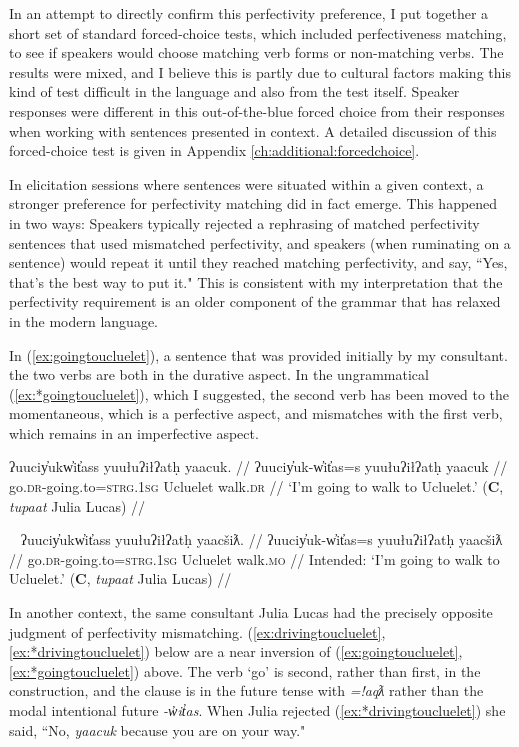 In an attempt to directly confirm this perfectivity preference, I put together a short set of standard forced-choice tests, which included perfectiveness matching, to see if speakers would choose matching verb forms or non-matching verbs. The results were mixed, and I believe this is partly due to cultural factors making this kind of test difficult in the language and also from the test itself. Speaker responses were different in this out-of-the-blue forced choice from their responses when working with sentences presented in context. A detailed discussion of this forced-choice test is given in Appendix \ref{ch:additional:forcedchoice}.

In elicitation sessions where sentences were situated within a given context, a stronger preference for perfectivity matching did in fact emerge. This happened in two ways: Speakers typically rejected a rephrasing of matched perfectivity sentences that used mismatched perfectivity, and speakers (when ruminating on a sentence) would repeat it until they reached matching perfectivity, and say, ``Yes, that's the best way to put it." This is consistent with my interpretation that the perfectivity requirement is an older component of the grammar that has relaxed in the modern language.

In (\ref{ex:goingtoucluelet}), a sentence that was provided initially by my consultant. the two verbs are both in the durative aspect. In the ungrammatical (\ref{ex:*goingtoucluelet}), which I suggested, the second verb has been moved to the momentaneous, which is a perfective aspect, and mismatches with the first verb, which remains in an imperfective aspect.

\ex \label{ex:goingtoucluelet}
\begingl
\glpreamble ʔuuciy̓ukw̓it̓ass yuułuʔiłʔatḥ yaacuk. //
\gla ʔuuciy̓uk-w̓it̓as=s yuułuʔiłʔatḥ yaacuk //
\glb go.\textsc{dr}-going.to=\textsc{strg.1sg} Ucluelet walk.\textsc{dr} //
\glft `I'm going to walk to Ucluelet.' (\textbf{C}, \textit{tupaat} Julia Lucas) //
\endgl
\xe

\ex~ \label{ex:*goingtoucluelet}
\begingl
\glpreamble *ʔuuciy̓ukw̓it̓ass yuułuʔiłʔatḥ yaacšiƛ. //
\gla ʔuuciy̓uk-w̓it̓as=s yuułuʔiłʔatḥ yaacšiƛ //
\glb go.\textsc{dr}-going.to=\textsc{strg.1sg} Ucluelet walk.\textsc{mo} //
\glft Intended: `I'm going to walk to Ucluelet.' (\textbf{C}, \textit{tupaat} Julia Lucas) //
\endgl
\xe

In another context, the same consultant Julia Lucas had the precisely opposite judgment of perfectivity mismatching. (\ref{ex:drivingtoucluelet}, \ref{ex:*drivingtoucluelet}) below are a near inversion of (\ref{ex:goingtoucluelet}, \ref{ex:*goingtoucluelet}) above. The verb `go' is second, rather than first, in the construction, and the clause is in the future tense with \textit{=!aqƛ} rather than the modal intentional future \textit{-w̓it̓as}.  When Julia rejected (\ref{ex:*drivingtoucluelet}) she said, ``No, \textit{yaacuk} because you are on your way."

